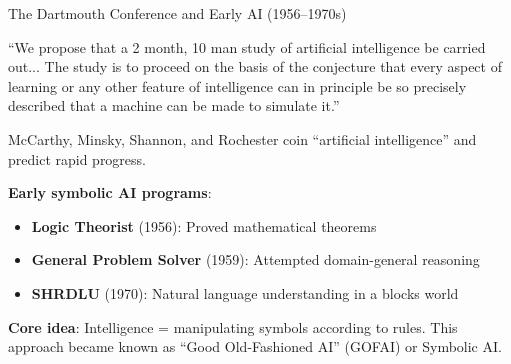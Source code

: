 ﻿\documentclass[aspectratio=169,11pt]{beamer}
\begin{document}
\begin{frame}{The Dartmouth Conference and Early AI (1956--1970s)}
\begin{casestudybox}
\scriptsize
``We propose that a 2 month, 10 man study of artificial intelligence be carried out... The study is to proceed on the basis of the conjecture that every aspect of learning or any other feature of intelligence can in principle be so precisely described that a machine can be made to simulate it.''
\end{casestudybox}

\vspace{0.2em}
McCarthy, Minsky, Shannon, and Rochester coin ``artificial intelligence'' and predict rapid progress.

\vspace{0.2em}
\textbf{Early symbolic AI programs}:
\begin{itemize}
    \item \textbf{Logic Theorist} (1956): Proved mathematical theorems
    \item \textbf{General Problem Solver} (1959): Attempted domain-general reasoning
    \item \textbf{SHRDLU} (1970): Natural language understanding in a blocks world
\end{itemize}

\textbf{Core idea}: Intelligence = manipulating symbols according to rules. This approach became known as ``Good Old-Fashioned AI'' (GOFAI) or Symbolic AI.
\end{frame}
\end{document}
